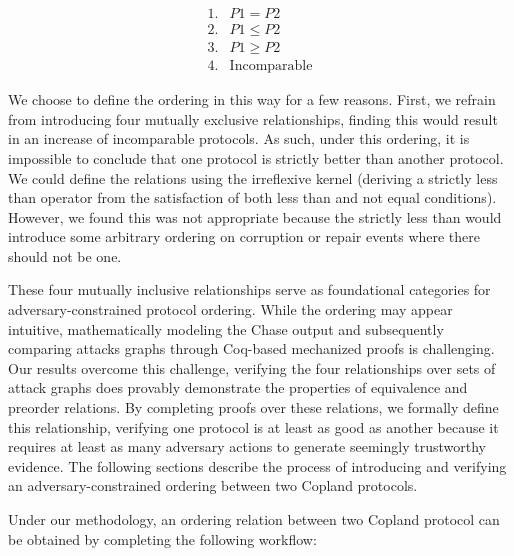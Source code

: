 \documentclass[runningheads]{llncs}
\theoremstyle{definition}
\begin{document}
\begin{align*}
1. & P1 = P2 \\
2. & P1 \le P2 \\
3. & P1 \ge P2 \\
4. & \text{Incomparable}
\end{align*}

\noindent We choose to define the ordering in this way for a few reasons. First, we refrain from introducing four mutually exclusive relationships, finding this would result in an increase of incomparable protocols. As such, under this ordering, it is impossible to conclude that one protocol is strictly better than another protocol. We could define the relations using the irreflexive kernel (deriving a strictly less than operator from the satisfaction of both less than and not equal conditions). However, we found this was not appropriate because the strictly less than would introduce some arbitrary ordering on corruption or repair events where there should not be one.  


These four mutually inclusive relationships serve as foundational categories for adversary-constrained protocol ordering. While the ordering may appear intuitive, mathematically modeling the Chase output and subsequently comparing attacks graphs through Coq-based mechanized proofs is challenging. Our results overcome this challenge, verifying the four relationships over sets of attack graphs does provably demonstrate the properties of equivalence and preorder relations. By completing proofs over these relations, we formally define this relationship, verifying one protocol is at least as good as another because it requires at least as many adversary actions to generate seemingly trustworthy evidence. The following sections describe the process of introducing and verifying an adversary-constrained ordering between two Copland protocols. 

Under our methodology, an ordering relation between two Copland protocol can be obtained by completing the following workflow:
\end{document}
